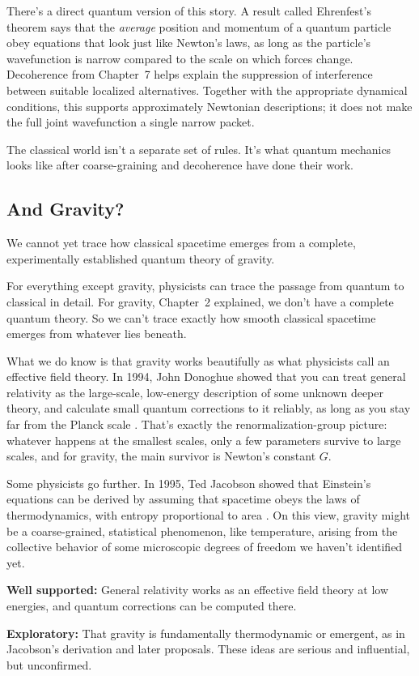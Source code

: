 There's a direct quantum version of this story. A result called Ehrenfest's theorem says that the \emph{average} position and momentum of a quantum particle obey equations that look just like Newton's laws, as long as the particle's wavefunction is narrow compared to the scale on which forces change. Decoherence from Chapter~7 helps explain the suppression of interference between suitable localized alternatives. Together with the appropriate dynamical conditions, this supports approximately Newtonian descriptions; it does not make the full joint wavefunction a single narrow packet.

The classical world isn't a separate set of rules. It's what quantum mechanics looks like after coarse-graining and decoherence have done their work.

\subsection{And Gravity?}

We cannot yet trace how classical spacetime emerges from a complete, experimentally established quantum theory of gravity.

For everything except gravity, physicists can trace the passage from quantum to classical in detail. For gravity, Chapter~2 explained, we don't have a complete quantum theory. So we can't trace exactly how smooth classical spacetime emerges from whatever lies beneath.

What we do know is that gravity works beautifully as what physicists call an effective field theory. In 1994, John Donoghue showed that you can treat general relativity as the large-scale, low-energy description of some unknown deeper theory, and calculate small quantum corrections to it reliably, as long as you stay far from the Planck scale \cite{donoghue1994}. That's exactly the renormalization-group picture: whatever happens at the smallest scales, only a few parameters survive to large scales, and for gravity, the main survivor is Newton's constant \(G\).

Some physicists go further. In 1995, Ted Jacobson showed that Einstein's equations can be derived by assuming that spacetime obeys the laws of thermodynamics, with entropy proportional to area \cite{jacobson1995}. On this view, gravity might be a coarse-grained, statistical phenomenon, like temperature, arising from the collective behavior of some microscopic degrees of freedom we haven't identified yet.

\begin{researchnotebox}
\textbf{Well supported:} General relativity works as an effective field theory at low energies, and quantum corrections can be computed there.

\textbf{Exploratory:} That gravity is fundamentally thermodynamic or emergent, as in Jacobson's derivation and later proposals. These ideas are serious and influential, but unconfirmed.
\end{researchnotebox}

